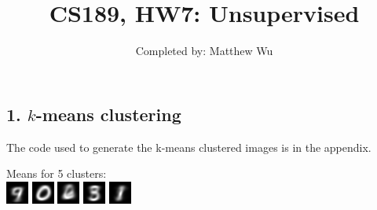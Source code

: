 \documentclass{article}
\title{CS189, HW7: Unsupervised}
\author{ Completed by: Matthew Wu}
\date{}
\begin{document}
\maketitle

\subsection*{1. $k$-means clustering}
The code used to generate the k-means clustered images is in the appendix.\\

\begin{mdframed}
Means for 5 clusters:\\

\includegraphics[]{images/mnist-5-clusters/0.png} \includegraphics[]{images/mnist-5-clusters/1.png} \includegraphics[]{images/mnist-5-clusters/2.png} \includegraphics[]{images/mnist-5-clusters/3.png} \includegraphics[]{images/mnist-5-clusters/4.png}
\end{mdframed}
\end{document}
